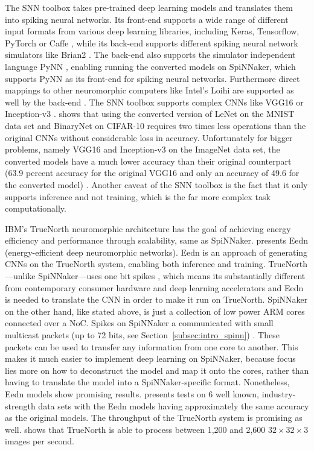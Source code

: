 \documentclass[]{article}
\begin{document}
The SNN toolbox takes pre-trained deep learning models and translates
them into spiking neural networks.
Its front-end supports a wide range of different input formats from
various deep learning libraries, including Keras, Tensorflow, PyTorch
or Caffe \citep{jia_et_al_2014}, while its back-end supports different
spiking neural network simulators like Brian2
\citep{stimberg_et_al_2019}.
The back-end also supports the simulator independent language PyNN
\citep{davison_et_al_2009}, enabling running the converted models
on SpiNNaker, which supports PyNN as its front-end for spiking neural
networks.
Furthermore direct mappings to other neuromorphic
computers like Intel's Loihi \citep{davies_et_al_2018} are supported
as well by the back-end \citep{snn_toolbox_2020}.
The SNN toolbox supports complex CNNs like VGG16 or Inception-v3
\citep{szegedy_et_al_2015, rueckauer_et_al_2017}.
\citet{rueckauer_et_al_2017} shows that using the converted version of
LeNet \citep{lecun_et_al_1989} on the MNIST data set
\citep{lecun_et_al_2020} and BinaryNet \citep{courbariaux_et_al_2016}
on CIFAR-10 \citep{krizhevsky_2009} requires two times
less operations than the original CNNs without considerable loss in
accuracy.
Unfortunately for bigger problems, namely VGG16 and Inception-v3 on
the ImageNet data set, the converted models have a much lower accuracy
than their original counterpart (63.9 percent accuracy for the
original VGG16 and only an accuracy of 49.6 for the converted model)
\citep{rueckauer_et_al_2017}.
Another caveat of the SNN toolbox is the fact that it only supports
inference and not training, which is the far more complex task
computationally.

IBM's TrueNorth neuromorphic architecture has the goal of
achieving energy efficiency and performance through scalability,
same as SpiNNaker.
\citet{esser_et_al_2016} presents Eedn (energy-efficient deep
neuromorphic networks).
Eedn is an approach of generating CNNs on the TrueNorth system,
enabling both inference and training.
TrueNorth---unlike SpiNNaker---uses one bit spikes
\citep{esser_et_al_2016}, which means its substantially different from
contemporary consumer hardware and deep learning accelerators and Eedn
is needed to translate the CNN in order to make it run on TrueNorth.
SpiNNaker on the other hand, like stated above, is just a collection
of low power ARM cores connected over a NoC.
Spikes on SpiNNaker a communicated with small multicast packets
(up to 72 bits, see Section~\ref{subsec:intro_spinn})
\citep{furber_et_al_2020}.
These packets can be used to transfer any information from one core
to another.
This makes it much easier to implement deep learning on SpiNNaker,
because focus lies more on how to deconstruct the model and map it
onto the cores, rather than having to translate the model into a
SpiNNaker-specific format.
Nonetheless, Eedn models show promising results.
\citet{esser_et_al_2016} presents tests on 6 well known,
industry-strength data sets with the Eedn models having approximately
the same accuracy as the original models.
The throughput of the TrueNorth system is promising as well.
\citet{esser_et_al_2016} shows that TrueNorth is able to process
between 1,200 and 2,600 $32\times32\times3$ images per second.
\end{document}
